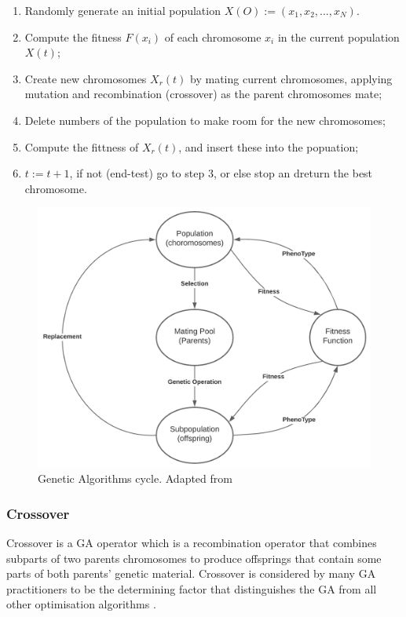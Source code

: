 \documentclass[a4paper, 11pt]{article}
\begin{document}
    \begin{enumerate}
       \item Randomly generate an initial population $X(O):= (x_{1}, x_{2}, ..., x_{N})$.
       \item Compute the fitness $F(x_{i})$ of each chromosome $x_{i}$ in the  current population $X(t)$;
       \item Create new chromosomes $X_{r}(t)$ by mating current chromosomes, applying mutation and recombination (crossover) as the 
       parent chromosomes mate;
       \item Delete numbers of the population  to make room for the new chromosomes;
       \item Compute the fittness of $X_{r}(t)$, and insert these into the popuation;
       \item $t:= t + 1$, if not (end-test) go to step 3, or else stop an dreturn the best chromosome.
       

   \end{enumerate}
        \begin{figure}[h!]
            \centering
            \graphicspath{{./wiki/}}
            \includegraphics[scale=0.8]{GA_cycle.png}
            \caption{Genetic Algorithms cycle. Adapted from \cite{Tang1996}}
            \label{Fig:GA_cycle}
        \end{figure}

        \subsubsection{Crossover}
            Crossover is a GA operator which is a recombination operator that combines subparts of two parents 
            chromosomes to produce offsprings that contain some parts of both parents' genetic material. Crossover
            is considered by many GA practitioners to be the determining factor that distinguishes the GA from
            all other optimisation algorithms \cite{Tang1996}.
\end{document}
